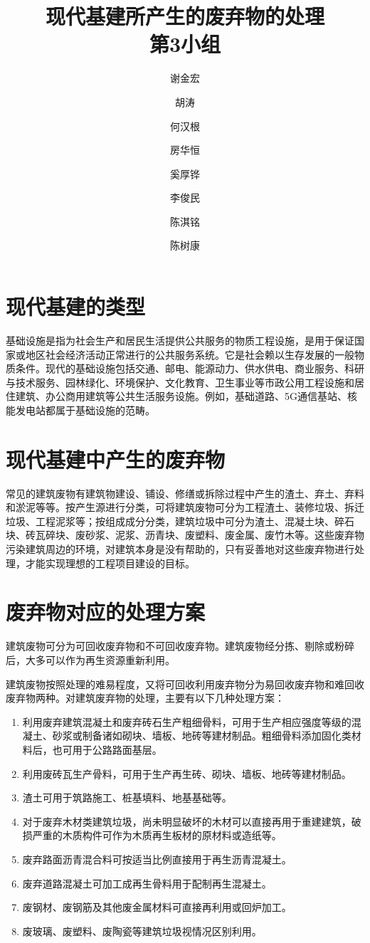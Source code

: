 \documentclass[UTF8]{ctexart}
\title{%
  现代基建所产生的废弃物的处理\\
  \large 第3小组}
\author{
谢金宏 \and 胡涛 \and 何汉根 \and 房华恒
\and 奚厚铧 \and 李俊民 \and 陈淇铭 \and 陈树康
}
\begin{document}
\maketitle

\section{现代基建的类型}


基础设施是指为社会生产和居民生活提供公共服务的物质工程设施，是用于保证国家或地区社会经济活动正常进行的公共服务系统。它是社会赖以生存发展的一般物质条件。现代的基础设施包括交通、邮电、能源动力、供水供电、商业服务、科研与技术服务、园林绿化、环境保护、文化教育、卫生事业等市政公用工程设施和居住建筑、办公商用建筑等公共生活服务设施。例如，基础道路、5G通信基站、核能发电站都属于基础设施的范畴。

\section{现代基建中产生的废弃物}

常见的建筑废物有建筑物建设、铺设、修缮或拆除过程中产生的渣土、弃土、弃料和淤泥等等。按产生源进行分类，可将建筑废物可分为工程渣土、装修垃圾、拆迁垃圾、工程泥浆等；按组成成分分类，建筑垃圾中可分为渣土、混凝土块、碎石块、砖瓦碎块、废砂浆、泥浆、沥青块、废塑料、废金属、废竹木等。这些废弃物污染建筑周边的环境，对建筑本身是没有帮助的，只有妥善地对这些废弃物进行处理，才能实现理想的工程项目建设的目标。

\section{废弃物对应的处理方案}

建筑废物可分为可回收废弃物和不可回收废弃物。建筑废物经分拣、剔除或粉碎后，大多可以作为再生资源重新利用。

建筑废物按照处理的难易程度，又将可回收利用废弃物分为易回收废弃物和难回收废弃物两种。对建筑废弃物的处理，主要有以下几种处理方案：

\begin{enumerate}
\item 利用废弃建筑混凝土和废弃砖石生产粗细骨料，可用于生产相应强度等级的混凝土、砂浆或制备诸如砌块、墙板、地砖等建材制品。粗细骨料添加固化类材料后，也可用于公路路面基层。
\item 利用废砖瓦生产骨料，可用于生产再生砖、砌块、墙板、地砖等建材制品。
\item 渣土可用于筑路施工、桩基填料、地基基础等。
\item 对于废弃木材类建筑垃圾，尚未明显破坏的木材可以直接再用于重建建筑，破损严重的木质构件可作为木质再生板材的原材料或造纸等。
\item 废弃路面沥青混合料可按适当比例直接用于再生沥青混凝土。
\item 废弃道路混凝土可加工成再生骨料用于配制再生混凝土。
\item 废钢材、废钢筋及其他废金属材料可直接再利用或回炉加工。
\item 废玻璃、废塑料、废陶瓷等建筑垃圾视情况区别利用。
\end{enumerate}
\end{document}
